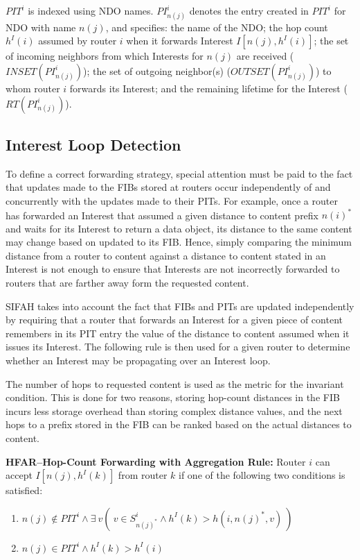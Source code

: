 \documentclass{ancs15-alternate}
\begin{document}
$PIT^i$ is indexed using NDO names.
$PI^i_{n(j)}$  denotes the entry created in $PIT^i$ for NDO with name $n(j)$, and specifies: the name of the NDO; 
the hop count $h^I (i)$ assumed by router $i$ when it forwards Interest $I[n(j), h^I (i) ]$; the set of incoming neighbors from which  Interests for $n(j)$ are received ($INSET(PI^i_{n(j)})$); the set of outgoing neighbor(s) ($OUTSET(PI^i_{n(j)})$) to whom router $i$ forwards its Interest;  
and the remaining lifetime for the Interest ($RT(PI^i_{n(j)})$).

\subsection{Interest Loop Detection}

To define  a correct forwarding strategy, special attention must be paid to the fact that updates made to the FIBs stored at routers occur independently of and concurrently with the updates made to their PITs. For example, once a router has forwarded an Interest that assumed a given  distance to content prefix $n(i)^*$ and waits for its Interest to return a data object,
its distance to the same content may change based on updated to its FIB. Hence, simply comparing the minimum distance from a router to content against a distance to content stated in an Interest is not enough to ensure that Interests are not incorrectly forwarded to routers that are farther away form the requested content.


SIFAH takes into account the fact that FIBs and PITs are updated independently  by requiring that a router that forwards an Interest for a given piece of content remembers in its PIT entry the value of the distance to content  assumed 
when it issues its Interest.  The  following rule is then used for a given router to determine whether  an Interest may be propagating over an Interest loop. 

The number of hops to requested content is used as the  
metric  for the invariant condition. This is done for two reasons, 
storing hop-count distances in the FIB incurs less storage overhead than storing complex distance values, and the next hops to a prefix stored in the FIB can be ranked based on the actual distances to content.

\vspace{0.1in}
{\bf HFAR--Hop-Count  Forwarding with Aggregation Rule:}  Router $i$ can 
accept $I[n(j), h^I(k)]$ from router $k$ if one of the following two conditions 
is satisfied:
\begin{enumerate}
\item
$n(j) \not\in PIT^i \wedge \exists ~v  (~ v \in  S^i_{n(j)^*}  \wedge h^I(k)  > h(i, n(j)^*, v) ~)$ 
\item
$n(j) \in PIT^i \wedge h^I(k)  > h^I(i)$
\end{enumerate}
\end{document}
